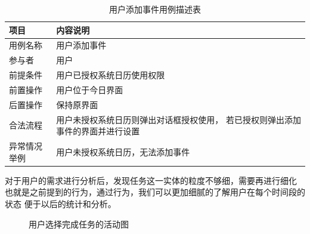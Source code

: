 \begin{table}[H]
	\centering
	\caption{用户添加事件用例描述表}
	\begin{tabular}{l|p{8cm}} \toprule
	  项目 & 内容说明 \\
	  \midrule
	  用例名称 & 用户添加事件 \\
	  参与者 & 用户 \\
	  前提条件 & 用户已授权系统日历使用权限 \\
	  前置操作 & 用户位于今日界面 \\
	  后置操作 & 保持原界面 \\
	  合法流程 & 用户未授权系统日历则弹出对话框授权使用，
	  若已授权则弹出添加事件的界面并进行设置 \\
	  异常情况举例 & 用户未授权系统日历，无法添加事件 \\
	  \bottomrule
	\end{tabular}
\end{table}

对于用户的需求进行分析后，发现任务这一实体的粒度不够细，需要再进行细化
也就是之前提到的行为，通过行为，我们可以更加细腻的了解用户在每个时间段的状态
便于以后的统计和分析。

\begin{figure}[H]
	\centering
	\caption{用户选择完成任务的活动图}
    \label{fig:activity}
\end{figure}

